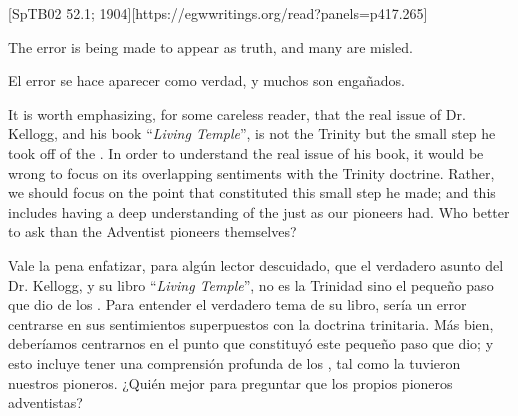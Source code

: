 [SpTB02 52.1; 1904][https://egwwritings.org/read?panels=p417.265]


The error is being made to appear as truth, and many are misled.


El error se hace aparecer como verdad, y muchos son engañados.


It is worth emphasizing, for some careless reader, that the real issue of Dr. Kellogg, and his book “\textit{Living Temple}”, is not the Trinity but the small step he took off of the . In order to understand the real issue of his book, it would be wrong to focus on its overlapping sentiments with the Trinity doctrine. Rather, we should focus on the point that constituted this small step he made; and this includes having a deep understanding of the  just as our pioneers had. Who better to ask than the Adventist pioneers themselves?


Vale la pena enfatizar, para algún lector descuidado, que el verdadero asunto del Dr. Kellogg, y su libro “\textit{Living Temple}”, no es la Trinidad sino el pequeño paso que dio de los . Para entender el verdadero tema de su libro, sería un error centrarse en sus sentimientos superpuestos con la doctrina trinitaria. Más bien, deberíamos centrarnos en el punto que constituyó este pequeño paso que dio; y esto incluye tener una comprensión profunda de los , tal como la tuvieron nuestros pioneros. ¿Quién mejor para preguntar que los propios pioneros adventistas?






